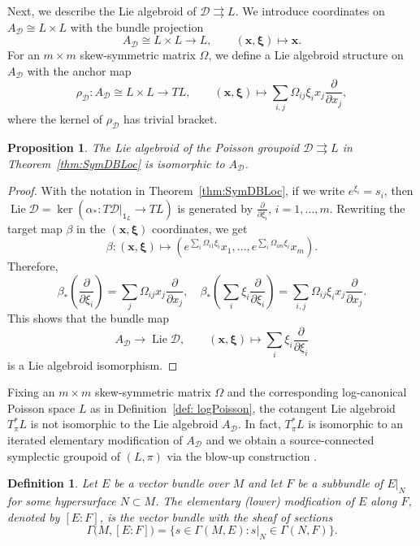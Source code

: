 \documentclass{amsart}
\newtheorem{definition}[theorem]{Definition}
\newtheorem{proposition}[theorem]{Proposition}
\numberwithin{equation}{section}
\newcommand{\bfx}{{\boldsymbol{x}}}
\newcommand{\bfxi}{\boldsymbol{\xi}}
\newcommand{\cD}{\mathcal{D}}
\newcommand{\Lie}{\operatorname{Lie}}
\newcommand{\rra}{\rightrightarrows}
\begin{document}
Next, we describe the Lie algebroid of $\cD \rra L$.
We introduce coordinates on $A_\cD \cong L\times L$ with the bundle projection
\[A_\cD \cong L\times L \to L, \qquad (\bfx, \bfxi) \mapsto \bfx.\]
For an $m\times m$ skew-symmetric matrix $\Omega$, we define a Lie algebroid structure on $A_\cD$ with the anchor map
\[\rho_\cD: A_\cD \cong L\times L \to TL, \qquad (\bfx, \bfxi) \mapsto \sum_{i,j} \Omega_{ij}\xi_i x_j\frac{\partial}{\partial x_j},\]
where the kernel of $\rho_\cD$ has trivial bracket.

\begin{proposition}
  The Lie algebroid of the Poisson groupoid $\cD \rra L$ in Theorem~\ref{thm:SymDBLoc} is isomorphic to $A_\cD$.
\end{proposition}
\begin{proof}
  With the notation in Theorem~\ref{thm:SymDBLoc}, if we write $e^{\xi_i} = s_i$, then $\Lie \cD = \ker \left(\alpha_*: T\cD|_{\mathtt{1}_L} \to TL \right)$ is generated by $\frac{\partial}{\partial \xi_i}$, $i = 1, \ldots, m$.
  Rewriting the target map $\beta$ in the $(\bfx, \bfxi)$ coordinates, we get
  \[\beta: (\bfx, \bfxi) \mapsto \left(e^{\sum_i\Omega_{i1}\xi_i}x_1, \ldots, e^{\sum_i\Omega_{im}\xi_i}x_m\right).\]
  Therefore, 
  \begin{equation} 
    \label{eq: D anchor}
    \beta_* \left(\frac{\partial}{\partial \xi_i}\right) = \sum_j \Omega_{ij} x_j \frac{\partial}{\partial x_j}, \quad 
    \beta_* \left(\sum_i \xi_i \frac{\partial}{\partial \xi_i}\right) = \sum_{i,j} \Omega_{ij} \xi_i x_j \frac{\partial}{\partial x_j}.
  \end{equation}
  This shows that the bundle map
  \[A_\cD \to \Lie \cD, \qquad (\bfx, \bfxi) \mapsto \sum_i \xi_i \frac{\partial}{\partial \xi_i}\]
  is a Lie algebroid isomorphism.
\end{proof}

Fixing an $m\times m$ skew-symmetric matrix $\Omega$ and the corresponding log-canonical Poisson space $L$ as in Definition~\ref{def: logPoisson}, the cotangent Lie algebroid $T^*_\pi L$ is not isomorphic to the Lie algebroid $A_\cD$.
In fact, $T^*_\pi L$ is isomorphic to an iterated elementary modification of $A_\cD$ and we obtain a source-connected symplectic groupoid of $(L,\pi)$ via the blow-up construction \cite{GL14}. 
\begin{definition}
  Let $E$ be a vector bundle over $M$ and let $F$ be a subbundle of $E|_N$ for some hypersurface $N\subset M$.
  The \emph{elementary (lower) modfication} of $E$ along $F$, denoted by $[E\!:\!F]$, is the vector bundle with the sheaf of sections
  \[\Gamma\big(M, [E\!:\!F]\big) = \{s \in \Gamma(M, E) : s|_N \in \Gamma(N, F) \}.\]
\end{definition}
\end{document}
